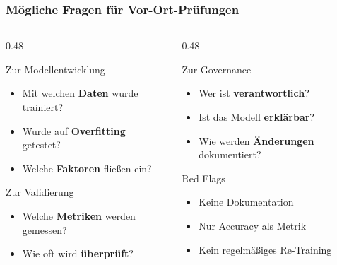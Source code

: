 \documentclass[11pt, aspectratio=169]{beamer}
\begin{document}

\begin{frame}
    \frametitle{Mögliche Fragen für Vor-Ort-Prüfungen}
    \begin{columns}[t]
        \begin{column}{0.48\textwidth}
            \begin{block}{Zur Modellentwicklung}
                \begin{itemize}
                    \item Mit welchen \textbf{Daten} wurde trainiert?
                    \item Wurde auf \textbf{Overfitting} getestet?
                    \item Welche \textbf{Faktoren} fließen ein?
                \end{itemize}
            \end{block}
            \vspace{0.2cm}
            \begin{block}{Zur Validierung}
                \begin{itemize}
                    \item Welche \textbf{Metriken} werden gemessen?
                    \item Wie oft wird \textbf{überprüft}?
                \end{itemize}
            \end{block}
        \end{column}
        \begin{column}{0.48\textwidth}
            \begin{block}{Zur Governance}
                \begin{itemize}
                    \item Wer ist \textbf{verantwortlich}?
                    \item Ist das Modell \textbf{erklärbar}?
                    \item Wie werden \textbf{Änderungen} dokumentiert?
                \end{itemize}
            \end{block}
            \vspace{0.2cm}
            \begin{alertblock}{Red Flags}
                \begin{itemize}
                    \item Keine Dokumentation
                    \item Nur \glqq Accuracy\grqq{} als Metrik
                    \item Kein regelmäßiges Re-Training
                \end{itemize}
            \end{alertblock}
        \end{column}
    \end{columns}
\end{frame}
\end{document}
